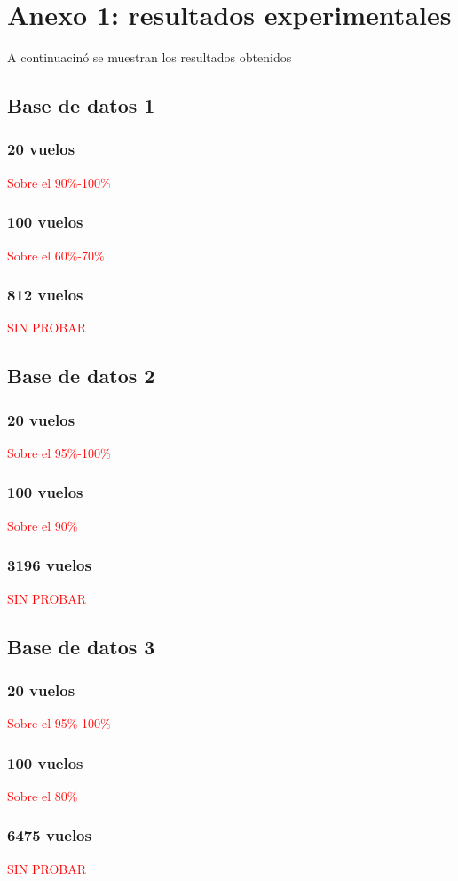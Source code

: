 \chapter{Anexo 1: resultados experimentales}
A continuacinó se muestran los resultados obtenidos



\section{Base de datos 1}
\subsection{20 vuelos}
\textcolor{red}{Sobre el 90\%-100\%}
\subsection{100 vuelos}
\textcolor{red}{Sobre el 60\%-70\%}
\subsection{812 vuelos}
\textcolor{red}{SIN PROBAR}

\section{Base de datos 2}
\subsection{20 vuelos}
\textcolor{red}{Sobre el 95\%-100\%}
\subsection{100 vuelos}
\textcolor{red}{Sobre el 90\%}
\subsection{3196 vuelos}
\textcolor{red}{SIN PROBAR}

\section{Base de datos 3}
\subsection{20 vuelos}
\textcolor{red}{Sobre el 95\%-100\%}
\subsection{100 vuelos}
\textcolor{red}{Sobre el 80\%}
\subsection{6475 vuelos}
\textcolor{red}{SIN PROBAR}
